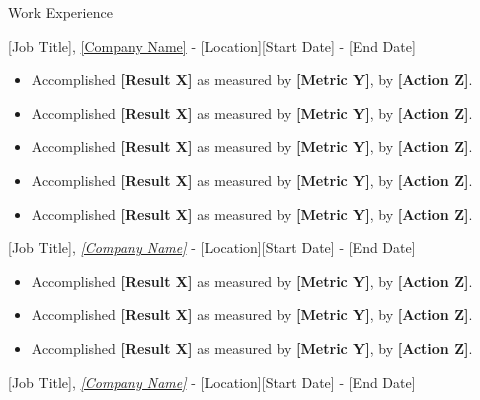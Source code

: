 \documentclass{resume} %
\begin{document}
\begin{rSection}{Work Experience}
\begin{rSubsection}
{[Job Title], \href{[Company URL]}{[Company Name]} - [Location]}{[Start Date] - [End Date]}{}{}
\begin{itemize}[left=-1.5em, labelsep=.1cm, labelwidth=.2cm, itemsep=0.0em]
\item Accomplished \textbf{[Result X]} as measured by \textbf{[Metric Y]}, by \textbf{[Action Z]}.
\item Accomplished \textbf{[Result X]} as measured by \textbf{[Metric Y]}, by \textbf{[Action Z]}.
\item Accomplished \textbf{[Result X]} as measured by \textbf{[Metric Y]}, by \textbf{[Action Z]}.
\item Accomplished \textbf{[Result X]} as measured by \textbf{[Metric Y]}, by \textbf{[Action Z]}.
\item Accomplished \textbf{[Result X]} as measured by \textbf{[Metric Y]}, by \textbf{[Action Z]}.
\end{itemize}
\end{rSubsection}

\begin{rSubsection}
{[Job Title], \href{[Company URL]}{\textit{[Company Name]}} - [Location]}{[Start Date] - [End Date]}{}{}

\begin{itemize}[left=-1.5em, labelsep=.1cm, labelwidth=.2cm, itemsep=0.0em]
\item Accomplished \textbf{[Result X]} as measured by \textbf{[Metric Y]}, by \textbf{[Action Z]}.
\item Accomplished \textbf{[Result X]} as measured by \textbf{[Metric Y]}, by \textbf{[Action Z]}.
\item Accomplished \textbf{[Result X]} as measured by \textbf{[Metric Y]}, by \textbf{[Action Z]}.
\end{itemize}
\end{rSubsection}

\begin{rSubsection}
{[Job Title], \href{[Company URL]}{\textit{[Company Name]}} - [Location]}{[Start Date] - [End Date]}{}{}

\begin{itemize}[left=-1.5em, labelsep=.1cm, labelwidth=.2cm, itemsep=0.0em]


\end{itemize}
\end{rSubsection}
\end{rSection}
\end{document}
